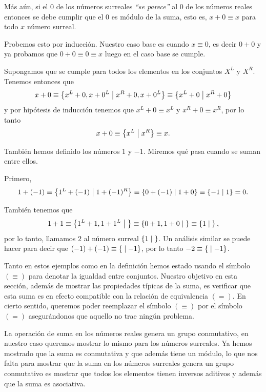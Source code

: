     \begin{example}
        Más aún, si el $0$ de los números surreales \textit{``se parece''} al $0$ de los números reales entonces se debe cumplir que el $0$ es módulo de la suma, esto es, $x+0 \equiv x$ para todo $x$ n\'umero surreal.

        Probemos esto por inducci\'on. Nuestro caso base es cuando $x \equiv 0$, es decir $0+0$ y ya probamos que $0+0\equiv 0\equiv x$ luego en el caso base se cumple.

        Supongamos que se cumple para todos los elementos en los conjuntos $X^L$ y $X^R$. Tenemos entonces que
        \[
            x + 0 \equiv \left\{x^L+0, x+0^L\;\middle|\; x^R+0, x+0^L\right\} \equiv \left\{x^L+0\;\middle|\; x^R+0\right\}
        \]
        y por hip\'otesis de inducci\'on tenemos que $x^L+0 \equiv x^L$ y $x^R+0 \equiv x^R$, por lo tanto 
        \[
            x + 0 \equiv \left\{x^L\;\middle|\; x^R\right\} \equiv x.
        \]
    \end{example}

    \begin{example}
        Tambi\'en hemos definido los n\'umeros $1$ y $-1$. Miremos qu\'e pasa cuando se suman entre ellos.

        Primero,
        \[
            1 + (-1) \equiv \left\{1^L + (-1)\;\middle|\; 1+(-1)^R\right\} \equiv \left\{0+(-1)\;\middle|\; 1+0\right\} \equiv \left\{-1\;\middle|\; 1\right\} = 0.
        \]

        Tambi\'en tenemos que
        \[
            1 + 1 \equiv \left\{1^L+1, 1+1^L\;\middle|\; \right\} \equiv \left\{0+1,1+0\;\middle|\; \right\} \equiv \left\{1\;\middle|\; \right\},
        \]
        por lo tanto, llamamos $2$ al n\'umero surreal $\left\{1\;\middle|\; \right\}$. Un an\'alisis similar se puede hacer para decir que $(-1)+(-1) \equiv \left\{\;\middle|\; -1\right\}$, por lo tanto $-2 \equiv \left\{\;\middle|\; -1\right\}$.
    \end{example}

    Tanto en estos ejemplos como en la definici\'on hemos estado usando el s\'imbolo $(\equiv)$ para denotar la igualdad entre conjuntos. Nuestro objetivo en esta secci\'on, adem\'as de mostrar las propiedades t\'ipicas de la suma, es verificar que esta suma es en efecto compatible con la relaci\'on de equivalencia $(=)$. En cierto sentido, queremos poder reemplazar el s\'imbolo $(\equiv)$ por el s\'imbolo $(=)$ asegur\'andonos que aquello no trae ning\'un problema.

    La operaci\'on de suma en los n\'umeros reales genera un grupo conmutativo, en nuestro caso queremos mostrar lo mismo para los n\'umeros surreales. Ya hemos mostrado que la suma es conmutativa y que adem\'as tiene un m\'odulo, lo que nos falta para mostrar que la suma en los n\'umeros surreales genera un grupo conmutativo es mostrar que todos los elementos tienen inversos aditivos y adem\'as que la suma es asociativa.

